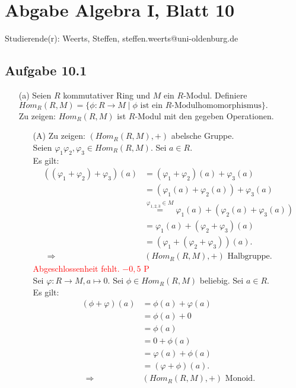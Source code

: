 \documentclass[12pt]{article}
\newcommand{\corr}[1]{\textcolor{red}{#1}}
\newcommand{\df}{\enspace\Longrightarrow\enspace}
\newcommand{\homr}{Hom_R(R,M)}
\begin{document}
\section*{Abgabe Algebra I, Blatt 10}

Studierende(r): Weerts, Steffen, steffen.weerts@uni-oldenburg.de

\subsection*{Aufgabe 10.1}
\begin{enumerate}
	\item[(a)] Seien $R$ kommutativer Ring und $M$ ein $R$-Modul. Definiere $\homr=\{\phi:R\rightarrow M\mid\phi\text{ ist ein $R$-Modulhomomorphismus}\}.$ \\
	Zu zeigen: $\homr$ ist $R$-Modul mit den gegeben Operationen.
	\begin{enumerate}
		\item[(A)] Zu zeigen: $(\homr,+)$ abelsche Gruppe. \\
		Seien $\varphi_1\varphi_2,\varphi_3\in\homr$. Sei $a\in R$. \\
		Es gilt:
		\begin{align*}
			((\varphi_1+\varphi_2)+\varphi_3)(a)&=(\varphi_1+\varphi_2)(a)+\varphi_3(a) \\
			&=(\varphi_1(a)+\varphi_2(a))+\varphi_3(a) \\
			&\overset{\varphi_{1,2,3}\in M}{=}\varphi_1(a)+(\varphi_2(a)+\varphi_3(a)) \\
			&=\varphi_1(a)+(\varphi_2+\varphi_3)(a) \\
			&=(\varphi_1+(\varphi_2+\varphi_3))(a). \\
			\df&(\homr,+)\text{ Halbgruppe}.
		\end{align*}
\corr{Abgeschlossenheit fehlt. $-0,5$ P}\\
		Sei $\varphi:R\rightarrow M,a\mapsto 0.$ Sei $\phi\in\homr$ beliebig. Sei $a\in R$. \\
		Es gilt:
		\begin{align*}
			(\phi+\varphi)(a)&=\phi(a)+\varphi(a) \\
			&=\phi(a)+0 \\
			&=\phi(a) \\
			&=0+\phi(a) \\
			&=\varphi(a)+\phi(a) \\
			&=(\varphi+\phi)(a). \\
			\df&(\homr,+)\text{ Monoid}.
		\end{align*}

\end{enumerate}
\end{enumerate}
\end{document}
